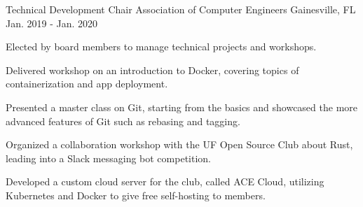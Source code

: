 \begin{cventries}
  \cventry
    {Technical Development Chair}
    {Association of Computer Engineers}
    {Gainesville, FL}
    {Jan. 2019 - Jan. 2020}
    {
      \begin{cvitems}
        \item {Elected by board members to manage technical projects and workshops.}
        \item {Delivered workshop on an introduction to Docker, covering topics of containerization and app deployment.}
        \item {Presented a master class on Git, starting from the basics and showcased the more advanced features of Git such as rebasing and tagging.}
        \item {Organized a collaboration workshop with the UF Open Source Club about Rust, leading into a Slack messaging bot competition.}
        \item {Developed a custom cloud server for the club, called ACE Cloud, utilizing Kubernetes and Docker to give free self-hosting to members.}
      \end{cvitems}
    }
\end{cventries}
